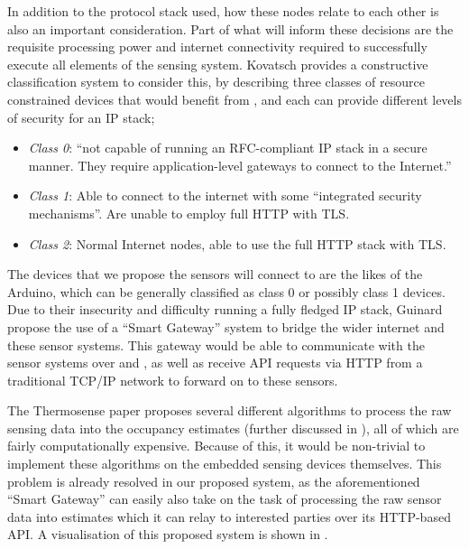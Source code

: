 \documentclass[../thesis/thesis.tex]{subfiles}
\begin{document}
In addition to the protocol stack used, how these nodes relate to each other is also an important consideration. Part of what will inform these decisions are the requisite processing power and internet connectivity required to successfully execute all elements of the sensing system. Kovatsch \cite{kovatsch2013coap} provides a constructive classification system to consider this, by describing three classes of resource constrained devices that would benefit from \coap, and each can provide different levels of security for an IP stack;

\begin{itemize}
 \item \emph{Class 0}: ``not capable of running an RFC-compliant IP stack in a secure manner. They require application-level gateways to connect to the Internet.''
 \item \emph{Class 1}: Able to connect to the internet with some ``integrated security mechanisms''. Are unable to employ full HTTP with TLS.
 \item \emph{Class 2}: Normal Internet nodes, able to use the full HTTP stack with TLS.
\end{itemize}

The devices that we propose the sensors will connect to are the likes of the Arduino, which can be generally classified as class 0 or possibly class 1 devices. Due to their insecurity and difficulty running a fully fledged IP stack, Guinard \etal \cite{guinard2011internet} propose the use of a ``Smart Gateway'' system to bridge the wider internet and these sensor systems. This gateway would be able to communicate with the sensor systems over \coap and \lwifi, as well as receive API requests via HTTP from a traditional TCP/IP network to forward on to these sensors.

The Thermosense paper \cite{beltran2013thermosense} proposes several different algorithms to process the raw sensing data into the occupancy estimates (further discussed in ), all of which are fairly computationally expensive. Because of this, it would be non-trivial to implement these algorithms on the embedded sensing devices themselves. This problem is already resolved in our proposed system, as the aforementioned ``Smart Gateway'' can easily also take on the task of processing the raw sensor data into estimates which it can relay to interested parties over its HTTP-based API. A visualisation of this proposed system is shown in .
\end{document}
